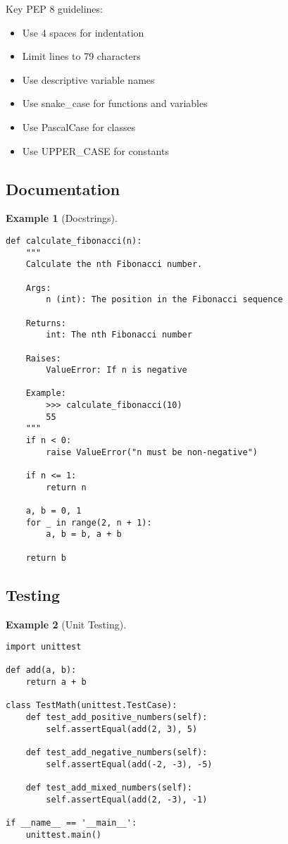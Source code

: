 \documentclass[11pt]{article}
\newtheorem{example}{Example}[section]
\begin{document}
Key PEP 8 guidelines:
\begin{itemize}
    \item Use 4 spaces for indentation
    \item Limit lines to 79 characters
    \item Use descriptive variable names
    \item Use snake\_case for functions and variables
    \item Use PascalCase for classes
    \item Use UPPER\_CASE for constants
\end{itemize}

\subsection{Documentation}

\begin{example}[Docstrings]
\begin{lstlisting}
def calculate_fibonacci(n):
    """
    Calculate the nth Fibonacci number.
    
    Args:
        n (int): The position in the Fibonacci sequence
        
    Returns:
        int: The nth Fibonacci number
        
    Raises:
        ValueError: If n is negative
        
    Example:
        >>> calculate_fibonacci(10)
        55
    """
    if n < 0:
        raise ValueError("n must be non-negative")
    
    if n <= 1:
        return n
    
    a, b = 0, 1
    for _ in range(2, n + 1):
        a, b = b, a + b
    
    return b
\end{lstlisting}
\end{example}

\subsection{Testing}

\begin{example}[Unit Testing]
\begin{lstlisting}
import unittest

def add(a, b):
    return a + b

class TestMath(unittest.TestCase):
    def test_add_positive_numbers(self):
        self.assertEqual(add(2, 3), 5)
    
    def test_add_negative_numbers(self):
        self.assertEqual(add(-2, -3), -5)
    
    def test_add_mixed_numbers(self):
        self.assertEqual(add(2, -3), -1)

if __name__ == '__main__':
    unittest.main()
\end{lstlisting}
\end{example}
\end{document}
